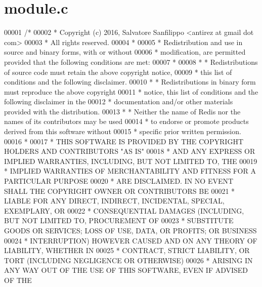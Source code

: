 \hypertarget{module_8c_source}{}\section{module.\+c}
\label{module_8c_source}

\begin{DoxyCode}
00001 \textcolor{comment}{/*}
00002 \textcolor{comment}{ * Copyright (c) 2016, Salvatore Sanfilippo <antirez at gmail dot com>}
00003 \textcolor{comment}{ * All rights reserved.}
00004 \textcolor{comment}{ *}
00005 \textcolor{comment}{ * Redistribution and use in source and binary forms, with or without}
00006 \textcolor{comment}{ * modification, are permitted provided that the following conditions are met:}
00007 \textcolor{comment}{ *}
00008 \textcolor{comment}{ *   * Redistributions of source code must retain the above copyright notice,}
00009 \textcolor{comment}{ *     this list of conditions and the following disclaimer.}
00010 \textcolor{comment}{ *   * Redistributions in binary form must reproduce the above copyright}
00011 \textcolor{comment}{ *     notice, this list of conditions and the following disclaimer in the}
00012 \textcolor{comment}{ *     documentation and/or other materials provided with the distribution.}
00013 \textcolor{comment}{ *   * Neither the name of Redis nor the names of its contributors may be used}
00014 \textcolor{comment}{ *     to endorse or promote products derived from this software without}
00015 \textcolor{comment}{ *     specific prior written permission.}
00016 \textcolor{comment}{ *}
00017 \textcolor{comment}{ * THIS SOFTWARE IS PROVIDED BY THE COPYRIGHT HOLDERS AND CONTRIBUTORS "AS IS"}
00018 \textcolor{comment}{ * AND ANY EXPRESS OR IMPLIED WARRANTIES, INCLUDING, BUT NOT LIMITED TO, THE}
00019 \textcolor{comment}{ * IMPLIED WARRANTIES OF MERCHANTABILITY AND FITNESS FOR A PARTICULAR PURPOSE}
00020 \textcolor{comment}{ * ARE DISCLAIMED. IN NO EVENT SHALL THE COPYRIGHT OWNER OR CONTRIBUTORS BE}
00021 \textcolor{comment}{ * LIABLE FOR ANY DIRECT, INDIRECT, INCIDENTAL, SPECIAL, EXEMPLARY, OR}
00022 \textcolor{comment}{ * CONSEQUENTIAL DAMAGES (INCLUDING, BUT NOT LIMITED TO, PROCUREMENT OF}
00023 \textcolor{comment}{ * SUBSTITUTE GOODS OR SERVICES; LOSS OF USE, DATA, OR PROFITS; OR BUSINESS}
00024 \textcolor{comment}{ * INTERRUPTION) HOWEVER CAUSED AND ON ANY THEORY OF LIABILITY, WHETHER IN}
00025 \textcolor{comment}{ * CONTRACT, STRICT LIABILITY, OR TORT (INCLUDING NEGLIGENCE OR OTHERWISE)}
00026 \textcolor{comment}{ * ARISING IN ANY WAY OUT OF THE USE OF THIS SOFTWARE, EVEN IF ADVISED OF THE}

\end{DoxyCode}
